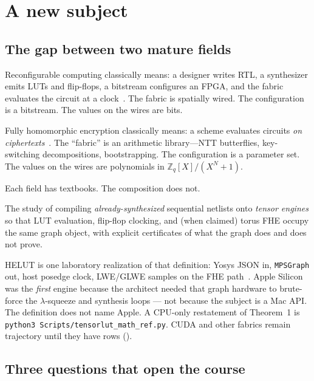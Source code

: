 \chapter{A new subject}
\label{ch:subject}

\section{The gap between two mature fields}

Reconfigurable computing classically means: a designer writes RTL, a synthesizer
emits LUTs and flip-flops, a bitstream configures an FPGA, and the fabric
evaluates the circuit at a clock~\cite{harris2012digital,gajski2009embedded}.
The fabric is spatially wired. The configuration is a bitstream. The values
on the wires are bits.

Fully homomorphic encryption classically means: a scheme evaluates circuits
\emph{on ciphertexts}~\cite{chillotti2020tfhe,ducas2015fhew}.
The ``fabric'' is an arithmetic library---NTT butterflies, key-switching
decompositions, bootstrapping. The configuration is a parameter set. The
values on the wires are polynomials in $\mathbb{Z}_q[X]/(X^N+1)$.

Each field has textbooks.
The composition does not.

\begin{definition}
The study of compiling \emph{already-synthesized} sequential netlists onto
\emph{tensor engines} so that LUT evaluation, flip-flop clocking, and
(when claimed) torus FHE occupy the same graph object, with explicit
certificates of what the graph does and does not prove.
\end{definition}

HELUT is one laboratory realization of that definition: Yosys JSON in,
\texttt{MPSGraph} out, host posedge clock, LWE/GLWE samples on the FHE
path~\cite{helut-paper}.
Apple Silicon was the \emph{first} engine because the architect needed that
graph hardware to brute-force the $\lambda$-squeeze and synthesis loops ---
not because the subject is a Mac API.
The definition does not name Apple.
A CPU-only restatement of Theorem~1 is
\texttt{python3 Scripts/tensorlut\_math\_ref.py}.
CUDA and other fabrics remain trajectory until they have  rows
().

\section{Three questions that open the course}

